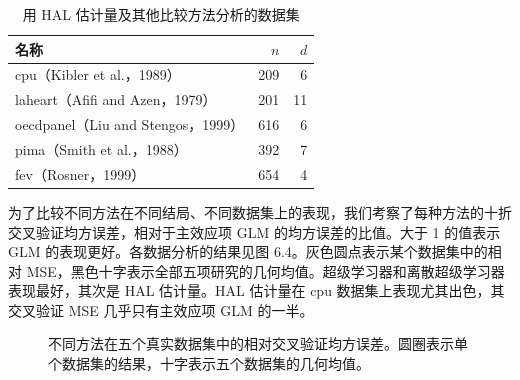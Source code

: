 \begin{table}[htbp]
 \centering
 \caption{用 HAL 估计量及其他比较方法分析的数据集}
 \label{tab:ch06-datasets}
 \begin{tabular}{lrr}
  \toprule
  名称 & $n$ & $d$\\
  \midrule
  cpu（Kibler et al.，1989） & 209 & 6\\
  laheart（Afifi and Azen，1979） & 201 & 11\\
  oecdpanel（Liu and Stengos，1999） & 616 & 6\\
  pima（Smith et al.，1988） & 392 & 7\\
  fev（Rosner，1999） & 654 & 4\\
  \bottomrule
 \end{tabular}
\end{table}

为了比较不同方法在不同结局、不同数据集上的表现，我们考察了每种方法的十折交叉验证均方误差，相对于主效应项 GLM 的均方误差的比值。大于 1 的值表示 GLM 的表现更好。各数据分析的结果见图 6.4。灰色圆点表示某个数据集中的相对 MSE，黑色十字表示全部五项研究的几何均值。超级学习器和离散超级学习器表现最好，其次是 HAL 估计量。HAL 估计量在 cpu 数据集上表现尤其出色，其交叉验证 MSE 几乎只有主效应项 GLM 的一半。

\begin{figure}[htbp]
 \centering
 
 \caption{不同方法在五个真实数据集中的相对交叉验证均方误差。圆圈表示单个数据集的结果，十字表示五个数据集的几何均值。}
 \label{fig:ch06-relative-mse}
\end{figure}
\FloatBarrier

